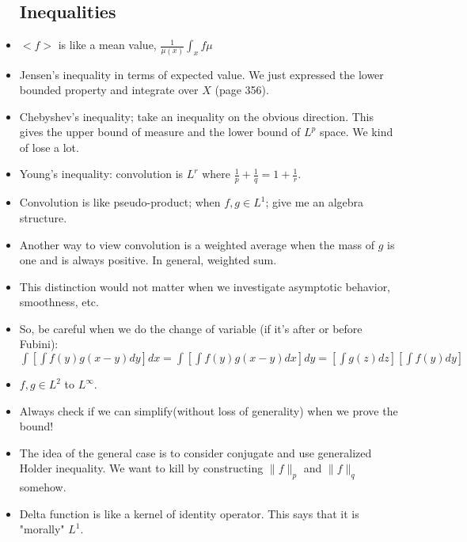 \documentclass{article}
\theoremstyle{remark}
\begin{document}
\begin{itemize}
\subsection*{Inequalities}
\item $<f>$ is like a mean value, $\frac 1{\mu(x)}\int_x f\mu$
\item Jensen's inequality in terms of expected value. We just expressed the lower bounded property and integrate over $X$ (page 356). 
\item Chebyshev's inequality; take an inequality on the obvious direction. This gives the upper bound of measure and the lower bound of $L^p$ space. We kind of lose a lot.
\item Young's inequality: convolution is $L^r$ where $\frac 1p+\frac1q=1+\frac1r$.
\item Convolution is like pseudo-product; when $f,g\in L^1$; give me an algebra structure.
\item Another way to view convolution is a weighted average when the mass of $g$ is one and is always positive. In general, weighted sum.
\item This distinction would not matter when we investigate asymptotic behavior, smoothness, etc.
\item So, be careful when we do the change of variable (if it's after or before Fubini): $\int[\int f(y)g(x-y)dy]dx=\int[\int f(y)g(x-y)dx]dy=[\int g(z)dz][\int f(y)dy]$
\item $f,g\in L^2$ to $L^\infty$. 
\item Always check if we can simplify(without loss of generality) when we prove the bound!
\item The idea of the general case is to consider conjugate and use generalized Holder inequality. We want to kill by constructing $\lVert f\rVert_p$ and $\lVert f\rVert_q$ somehow.
\item Delta function is like a kernel of identity operator. This says that it is "morally" $L^1$.

\end{itemize}
\end{document}
